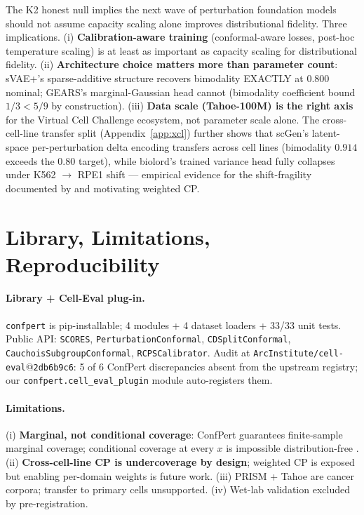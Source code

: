 \documentclass{article}
\begin{document}
The K2 honest null implies the next wave of perturbation foundation models should not assume capacity scaling alone improves distributional fidelity. Three implications. (i) \textbf{Calibration-aware training} (conformal-aware losses, post-hoc temperature scaling) is at least as important as capacity scaling for distributional fidelity. (ii) \textbf{Architecture choice matters more than parameter count}: sVAE+'s sparse-additive structure recovers bimodality EXACTLY at $0.800$ nominal; GEARS's marginal-Gaussian head cannot (bimodality coefficient bound $1/3 < 5/9$ by construction). (iii) \textbf{Data scale (Tahoe-100M) is the right axis} for the Virtual Cell Challenge ecosystem, not parameter scale alone. The cross-cell-line transfer split (Appendix~\ref{app:xcl}) further shows that scGen's latent-space per-perturbation delta encoding transfers across cell lines (bimodality $0.914$ exceeds the $0.80$ target), while biolord's trained variance head fully collapses under K562 $\rightarrow$ RPE1 shift --- empirical evidence for the shift-fragility documented by \citet{tibshirani2019} and motivating weighted CP.

\section{Library, Limitations, Reproducibility}

\paragraph{Library + Cell-Eval plug-in.} \texttt{confpert} is pip-installable; 4 modules + 4 dataset loaders + 33/33 unit tests. Public API: \texttt{SCORES}, \texttt{PerturbationConformal}, \texttt{CDSplitConformal}, \texttt{CauchoisSubgroupConformal}, \texttt{RCPSCalibrator}. Audit at \texttt{ArcInstitute/cell-eval}@\texttt{2db6b9c6}: 5 of 6 ConfPert discrepancies absent from the upstream registry; our \texttt{confpert.cell\_eval\_plugin} module auto-registers them.

\paragraph{Limitations.} (i) \textbf{Marginal, not conditional coverage}: ConfPert guarantees finite-sample marginal coverage; conditional coverage at every $x$ is impossible distribution-free \citep{vovk2012}. (ii) \textbf{Cross-cell-line CP is undercoverage by design}; \citet{tibshirani2019} weighted CP is exposed but enabling per-domain weights is future work. (iii) PRISM + Tahoe are cancer corpora; transfer to primary cells unsupported. (iv) Wet-lab validation excluded by pre-registration.
\end{document}
